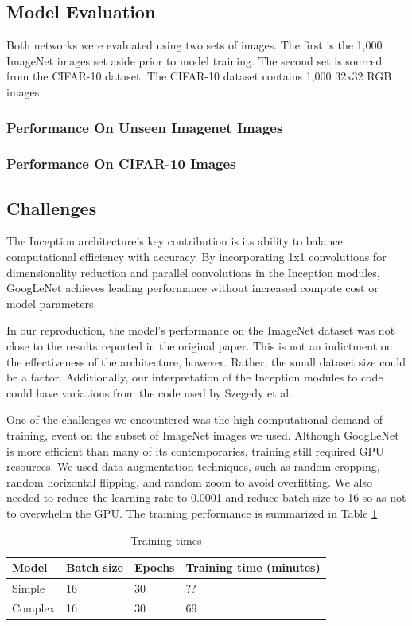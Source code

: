 \documentclass{article}
\begin{document}
\subsection{Model Evaluation}
Both networks were evaluated using two sets of images. The first is the 1,000 ImageNet images set aside prior to model training. The second set is sourced from the CIFAR-10 dataset. The CIFAR-10 dataset contains 1,000 32x32 RGB images.

\subsubsection{Performance On Unseen Imagenet Images}

\subsubsection{Performance On CIFAR-10 Images}

\subsection{Challenges}
The Inception architecture's key contribution is its ability to balance computational efficiency with accuracy. By incorporating 1x1 convolutions for dimensionality reduction and parallel convolutions in the Inception modules, GoogLeNet achieves leading performance without increased compute cost or model parameters.

In our reproduction, the model's performance on the ImageNet dataset was not  close to the results reported in the original paper. This is not an indictment on the effectiveness of the architecture, however. Rather, the small dataset size could be a factor. Additionally, our interpretation of the Inception modules to code could have variations from the code used by Szegedy et al.

One of the challenges we encountered was the high computational demand of training, event on the subset of ImageNet images we used. Although GoogLeNet is more efficient than many of its contemporaries, training still required GPU resources. We used data augmentation techniques, such as random cropping, random horizontal flipping, and random zoom to avoid overfitting. We also needed to reduce the learning rate to 0.0001 and reduce batch size to 16 so as not to overwhelm the GPU. The training performance is summarized in Table \ref{tab:training_times}

\begin{table}[ht]
    \centering
    \begin{tabular}{llll}
    \hline
    \textbf{Model} & \textbf{Batch size} & \textbf{Epochs} & \textbf{Training time (minutes)} \\  \hline
    Simple & 16 & 30 & ?? \\ \hline
    Complex & 16 & 30 & 69 \\ \hline
    \end{tabular}
    \caption{Training times}
    \label{tab:training_times}
\end{table}
\end{document}
